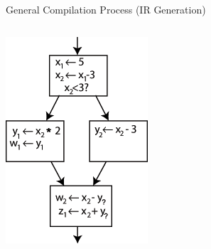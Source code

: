 \documentclass{beamer}
\begin{document}
\begin{frame}[fragile]{General Compilation Process (IR Generation)}
\begin{columns}[T,onlytextwidth]
            \includegraphics[width=\linewidth]{images/ssa2.png}
        \endminipage\hfill

\end{columns}
\end{frame}
\end{document}

